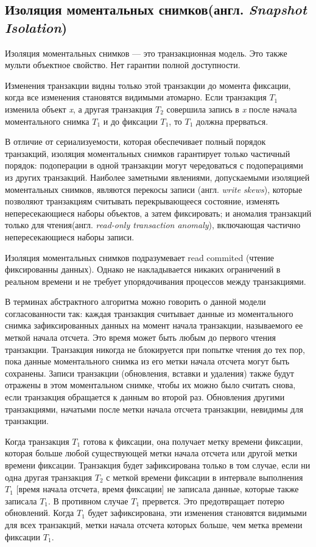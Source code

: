 \documentclass[12pt,  openany]{book}
\begin{document}
\subsection{Изоляция моментальных снимков(англ.  \textit{Snapshot Isolation})}
Изоляция моментальных снимков --- это транзакционная модель. Это также мульти объектное свойство.
Нет гарантии полной доступности. 
\par
Изменения транзакции видны только этой транзакции до момента фиксации, когда все изменения становятся видимыми атомарно. Если транзакция $T_1$ изменила объект \textit{x}, а другая транзакция $T_2$ совершила запись в \textit{x} после начала моментального снимка $T_1$ и до фиксации $T_1$, то $T_1$ должна прерваться.
\par
В отличие от сериализуемости, которая обеспечивает полный порядок транзакций, изоляция моментальных снимков гарантирует только частичный порядок: подоперации в одной транзакции могут чередоваться с подоперациями из других транзакций. Наиболее заметными явлениями, допускаемыми изоляцией моментальных снимков, являются перекосы записи (англ. \textit{write skews}), которые позволяют транзакциям считывать перекрывающееся состояние, изменять непересекающиеся наборы объектов, а затем фиксировать; и аномалия транзакций только для чтения(англ.  \textit{read-only transaction anomaly}), включающая частично непересекающиеся наборы записи.
\par
Изоляция моментальных снимков подразумевает read commited (чтение фиксированны данных). Однако не накладывается никаких ограничений в реальном времени и не требует упорядочивания процессов между транзакциями.
\par
\cite {BerensonIsolationLevels} В терминах абстрактного алгоритма можно говорить о данной модели согласованности так: каждая транзакция считывает данные из моментального снимка зафиксированных данных на момент начала транзакции, называемого ее меткой начала отсчета. Это время может быть любым до первого чтения транзакции. Транзакция никогда не блокируется при попытке чтения до тех пор, пока данные моментального снимка из его метки начала отсчета могут быть сохранены. Записи транзакции (обновления, вставки и удаления) также будут отражены в этом моментальном снимке, чтобы их можно было считать снова, если транзакция обращается к данным во второй раз. Обновления другими транзакциями, начатыми после метки начала отсчета транзакции, невидимы для транзакции. 
\par
Когда транзакция $T_1$ готова к фиксации, она получает метку времени фиксации, которая больше любой существующей метки начала отсчета или другой метки времени фиксации. Транзакция будет зафиксирована только в том случае, если ни одна другая транзакция $T_2$ с меткой времени фиксации в интервале выполнения $T_1$ [время начала отсчета, время фиксации] не записала данные, которые также записала $T_1$. В противном случае $T_1$ прервется. Это предотвращает потерю обновлений. Когда $T_1$ будет зафиксирована, эти изменения становятся видимыми для всех транзакций, метки начала отсчета которых больше, чем метка времени фиксации $T_1$.
\end{document}
